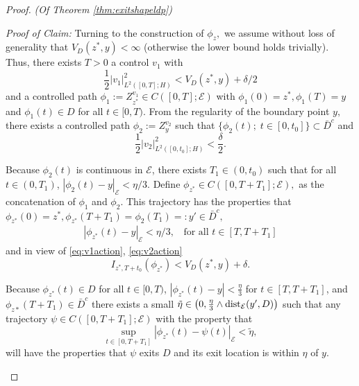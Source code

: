 \documentclass[10pt, reqno]{amsart}
\newcommand{\e}{\mathcal{E}}
\theoremstyle{definition}
\numberwithin{lem}{section}
\numberwithin{cor}{section}
\numberwithin{prop}{section}
\numberwithin{thm}{section}
\numberwithin{dfn}{section}
\begin{document}
\begin{proof}{\textit{(Of Theorem \ref{thm:exitshapeldp})}}
\begin{enumerate}
 \textit{Proof of Claim:} Turning to the construction of $\phi_z,$ we assume without loss of generality that $V_D(z^*, y)<\infty$ (otherwise the lower bound holds trivially). Thus, there exists $T>0$ a control $v_1$ with  \begin{equation}\label{eq:v1action}
     \frac{1}{2}|v_1|^2_{L^2([0, T];H)}<V_D(z^*, y)+\delta/2
 \end{equation}  and a controlled path $\phi_1:=Z^{v_1}_{z^*}\in C([0,T];\e)$ with  $\phi_1(0)=z^*, \phi_1(T)=y$ and $\phi_1(t)\in D$ for all $t\in[0, T ).$ From the regularity of the boundary point $y,$ there exists a controlled path $\phi_2:=Z_y^{v_2}$ such that $\{\phi_2(t);\;t\in[0,t_0]\}\subset\bar{D}^c$ and
\begin{equation}\label{eq:v2action}
    \frac{1}{2}|v_2|^2_{L^2([0,t_0];H)}<\frac{\delta}{2}.
\end{equation}

Because $\phi_2(t)$ is continuous in $\e$, there exists $T_1 \in (0,t_0)$ such that for all $t \in (0,T_1)$, 
$|\phi_2(t)-y|_{\e}<\eta/3.     $
 Define $\phi_{z^*}\in C([0,T+T_1];\e),$ as the concatenation of $\phi_1$ and  $\phi_2$. This trajectory has the properties that $\phi_{z^*}(0)=z^*, \phi_{z^*}(T+T_1)=\phi_2(T_1)=:y'\in \bar{D}^c,$  
\begin{equation}\label{eq:phiydistance}
    \begin{aligned}
        |\phi_{z^*}(t)-y|_{\e}<\eta/3,\;\; \text{ for all } t\in[T, T+T_1]
    \end{aligned}
\end{equation}
and in view of \eqref{eq:v1action}, \eqref{eq:v2action}
\begin{equation}\label{eq:phiaction}
    I_{z^*, T+t_0}(\phi_{z^*})<V_D(z^*,  y)+\delta.
\end{equation}

Because $\phi_{z^*}(t) \in D$ for all $t \in [0,T)$,  $|\phi_{z^*}(t) -y|< \frac{\eta}{3}$ for $t \in [T, T+T_1]$, and $\phi_{z*}(T+T_1) \in \bar{D}^c$ there exists a small $\tilde{\eta} \in \left(0,\frac{\eta}{3} \wedge \textnormal{dist}_\e(y',D) \right)$ such that any trajectory $\psi \in C([0,T + T_1];\e)$ with the property that
\begin{equation} \label{eq:exit-tube}
    \sup_{t \in [0,T + T_1]}|\phi_{z^*}(t) - \psi(t)|_\e< \tilde{\eta},
\end{equation}
will have the properties that $\psi$ exits $D$ and its exit location is within $\eta$ of $y$.


\end{enumerate}
\end{proof}
\end{document}
